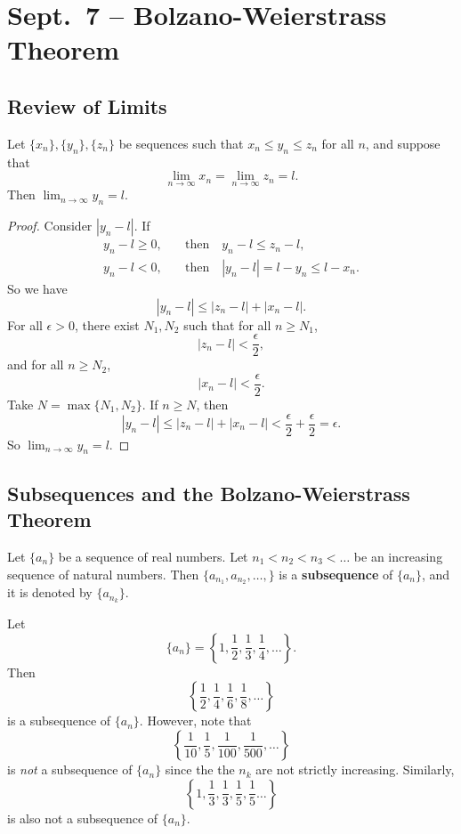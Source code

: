 \chapter{Sept.~7 -- Bolzano-Weierstrass Theorem}

\section{Review of Limits}

\begin{theorem}
  Let $\{x_n\}, \{y_n\}, \{z_n\}$ be sequences such
  that $x_n \le y_n \le z_n$ for all $n$, and suppose that
  \[\lim_{n \to \infty} x_n = \lim_{n \to \infty} z_n = l.\]
  Then $\lim_{n \to \infty} y_n = l$.
\end{theorem}

\begin{proof}
  Consider $|y_n - l|$.
  If
  \begin{align*}
    y_n - l \ge 0, &\quad \text{then} \quad y_n - l \le z_n - l, \\
    y_n - l < 0, &\quad \text{then} \quad |y_n - l| = l - y_n \le l - x_n.
  \end{align*}
  So we have
  \[
  |y_n - l| \le |z_n - l| + |x_n - l|
  .\]
  For all $\epsilon > 0$, there exist $N_1, N_2$ such that
  for all $n \ge N_1$,
  \[
  |z_n - l| < \frac{\epsilon}{2},
  \]
  and for all $n \ge N_2$, \[
  |x_n - l| < \frac{\epsilon}{2}
  .\]
  Take $N = \max\{N_1, N_2\}$. If $n \ge N$, then
  \[
  |y_n - l| \le |z_n - l| + |x_n - l| <
  \frac{\epsilon}{2} + \frac{\epsilon}{2} = \epsilon
  .\]
  So $\lim_{n \to \infty} y_n = l$.
\end{proof}

\section{Subsequences and the Bolzano-Weierstrass Theorem}
\begin{definition}
  Let $\{a_n\}$ be a sequence of real numbers.
  Let $n_1 < n_2 < n_3 < \dots$ be an increasing sequence of
  natural numbers. Then $\{a_{n_1}, a_{n_2}, \dots, \}$
  is a \textbf{subsequence} of $\{a_n\}$, and it is
  denoted by $\{a_{n_k}\}$.
\end{definition}

\begin{example}
  Let
  \[\{a_n\} = \left\{1, \frac{1}{2}, \frac{1}{3}, \frac{1}{4}, \dots\right\}.\]
  Then 
  \[\left\{\frac{1}{2}, \frac{1}{4}, \frac{1}{6}, \frac{1}{8}, \dots\right\}\]
  is a subsequence of $\{a_n\}$.
  However, note that
  \[\left\{\frac{1}{10}, \frac{1}{5}, \frac{1}{100}, \frac{1}{500}, \dots\right\}\]
  is \textit{not} a subsequence of $\{a_n\}$ since the
  the $n_k$ are not strictly increasing. Similarly,
  \[\left\{1, \frac{1}{3}, \frac{1}{3}, \frac{1}{5}, \frac{1}{5} \dots\right\}\]
  is also not a subsequence of $\{a_n\}$.
\end{example}

